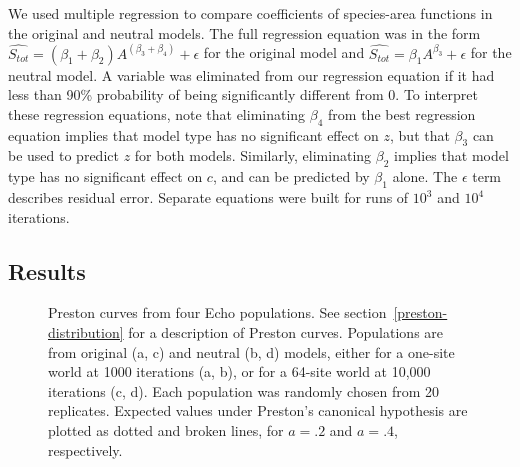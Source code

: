 We used multiple regression to compare coefficients of species-area
functions in the original and neutral models.  
The full regression equation was in the form
$\widehat{S_{tot}} = (\beta _1 + \beta _2)A^{(\beta _3 + \beta _4)} +
\epsilon$ for the original model and $\widehat{S_{tot}} = \beta _1
A^{\beta _{3}} + \epsilon$ for the neutral model.  A variable was
eliminated from our regression equation if it had less than 90\%
probability of being significantly different from 0.  To
interpret these regression equations, note that eliminating $\beta _4$
from the best regression equation implies that model type has no
significant effect on $z$, but that $\beta _3$ can be used to predict
$z$ for both models.  Similarly, eliminating $\beta _2$ implies that
model type has no significant effect on $c$, and can be predicted by
$\beta _1$ alone.  The $\epsilon$ term describes residual error.
Separate equations were built for runs of $10^3$ and $10^4$ iterations.

\subsection{Results}

\begin{figure}[t!]
\begin{center}
\leavevmode
\ifepsf
{}
\else
{}
\fi
\caption{Preston curves from four Echo populations.  See
  section~\protect\ref{preston-distribution} for a description of
  Preston curves.  Populations are from original (a, c) and neutral
  (b, d) models, either for a one-site world at 1000 iterations
  (a, b), or for a 64-site world at 10,000 iterations (c, d).  Each
  population was randomly chosen from 20 replicates.  Expected values
  under Preston's canonical hypothesis are plotted as dotted and
  broken lines, for $a=.2$ and $a=.4$, respectively.
\label{fig:preston-curves}}
\end{center}
\end{figure}


